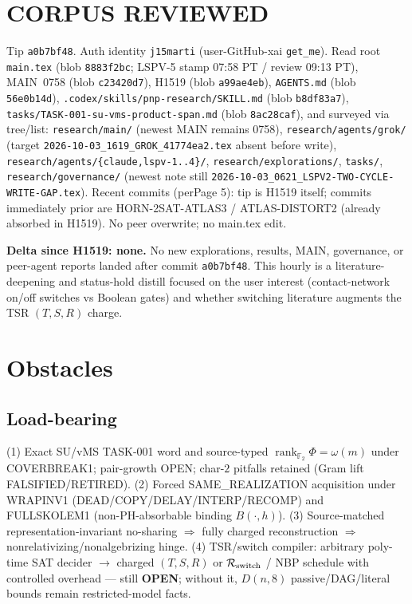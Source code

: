 \documentclass[11pt]{article}
\begin{document}
\section*{CORPUS REVIEWED}
Tip \texttt{a0b7bf48}. Auth identity \texttt{j15marti}
(user-GitHub-xai \texttt{get\_me}).
Read root \texttt{main.tex} (blob \texttt{8883f2bc}; LSPV-5 stamp 07:58 PT / review 09:13 PT),
MAIN~0758 (blob \texttt{c23420d7}),
H1519 (blob \texttt{a99ae4eb}),
\texttt{AGENTS.md} (blob \texttt{56e0b14d}),
\texttt{.codex/skills/pnp-research/SKILL.md} (blob \texttt{b8df83a7}),
\texttt{tasks/TASK-001-su-vms-product-span.md} (blob \texttt{8ac28caf}),
and surveyed via tree/list:
\texttt{research/main/} (newest MAIN remains 0758),
\texttt{research/agents/grok/} (target \texttt{2026-10-03\_1619\_GROK\_41774ea2.tex} absent before write),
\texttt{research/agents/\{claude,lspv-1..4\}/},
\texttt{research/explorations/},
\texttt{tasks/},
\texttt{research/governance/} (newest note still
\texttt{2026-10-03\_0621\_LSPV2-TWO-CYCLE-WRITE-GAP.tex}).
Recent commits (perPage 5): tip is H1519 itself; commits immediately prior are
HORN-2SAT-ATLAS3 / ATLAS-DISTORT2 (already absorbed in H1519).
No peer overwrite; no main.tex edit.

\textbf{Delta since H1519: none.}
No new explorations, results, MAIN, governance, or peer-agent reports landed after
commit \texttt{a0b7bf48}. This hourly is a literature-deepening and status-hold distill
focused on the user interest (contact-network on/off switches vs Boolean gates) and
whether switching literature augments the TSR $(T,S,R)$ charge.

\section*{Obstacles}
\subsection*{Load-bearing}
(1) Exact SU/vMS TASK-001 word and source-typed
$\operatorname{rank}_{\mathbb F_2}\Phi=\omega(m)$ under COVERBREAK1; pair-growth OPEN;
char-$2$ pitfalls retained (Gram lift FALSIFIED/RETIRED).
(2) Forced SAME\_REALIZATION acquisition under WRAPINV1
(DEAD/COPY/DELAY/INTERP/RECOMP) and FULLSKOLEM1 (non-PH-absorbable binding $B(\cdot,h)$).
(3) Source-matched representation-invariant no-sharing $\Rightarrow$ fully charged reconstruction
$\Rightarrow$ nonrelativizing/nonalgebrizing hinge.
(4) TSR/switch compiler: arbitrary poly-time SAT decider $\to$ charged $(T,S,R)$ or
$\mathcal R_{\rm switch}$ / NBP schedule with controlled overhead --- still \textbf{OPEN};
without it, $D(n,8)$ passive/DAG/literal bounds remain restricted-model facts.
\end{document}
